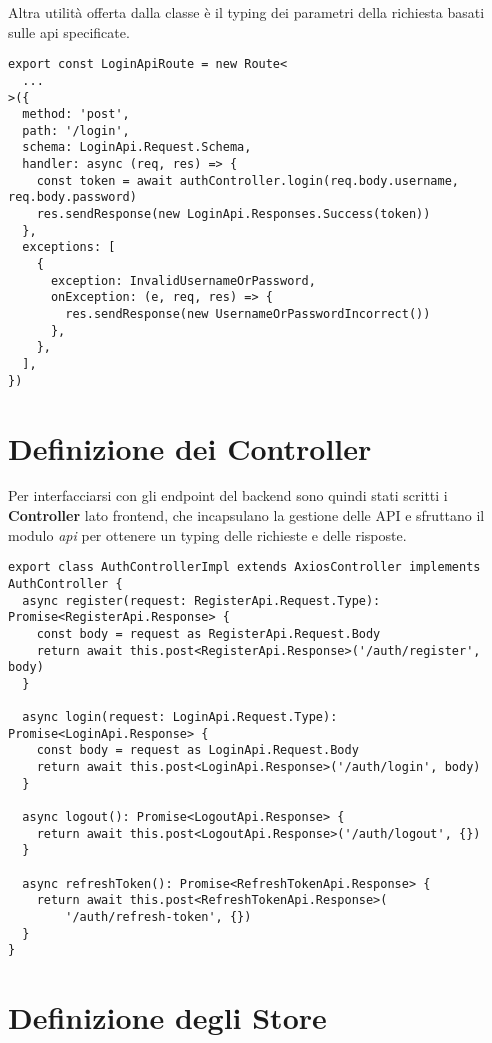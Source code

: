 Altra utilità offerta dalla classe è il typing dei parametri della richiesta basati sulle api specificate.

\begin{lstlisting}[style=typescript, caption={Definizione API}, label=lst:login:route]
export const LoginApiRoute = new Route<
  ...
>({
  method: 'post',
  path: '/login',
  schema: LoginApi.Request.Schema,
  handler: async (req, res) => {
    const token = await authController.login(req.body.username, req.body.password)
    res.sendResponse(new LoginApi.Responses.Success(token))
  },
  exceptions: [
    {
      exception: InvalidUsernameOrPassword,
      onException: (e, req, res) => {
        res.sendResponse(new UsernameOrPasswordIncorrect())
      },
    },
  ],
})
\end{lstlisting}

\section{Definizione dei Controller}

Per interfacciarsi con gli endpoint del backend sono quindi stati scritti i \textbf{Controller} lato frontend, che incapsulano la gestione delle API e sfruttano il modulo \textit{api} per ottenere un typing delle richieste e delle risposte.

\begin{lstlisting}[style=typescript, caption={Definizione Controller}, label=lst:controller]
export class AuthControllerImpl extends AxiosController implements AuthController {
  async register(request: RegisterApi.Request.Type): Promise<RegisterApi.Response> {
    const body = request as RegisterApi.Request.Body
    return await this.post<RegisterApi.Response>('/auth/register', body)
  }

  async login(request: LoginApi.Request.Type): Promise<LoginApi.Response> {
    const body = request as LoginApi.Request.Body
    return await this.post<LoginApi.Response>('/auth/login', body)
  }

  async logout(): Promise<LogoutApi.Response> {
    return await this.post<LogoutApi.Response>('/auth/logout', {})
  }

  async refreshToken(): Promise<RefreshTokenApi.Response> {
    return await this.post<RefreshTokenApi.Response>(
        '/auth/refresh-token', {})
  }
}
\end{lstlisting}

%
%
%
\section{Definizione degli Store}

